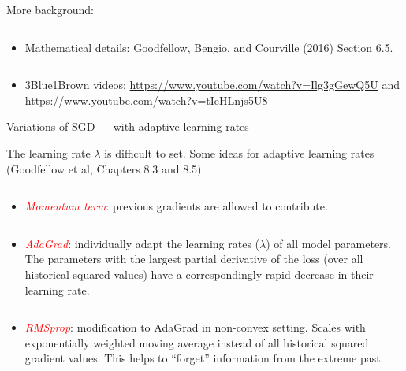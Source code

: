 \documentclass[10pt,ignorenonframetext,]{beamer}
\providecommand{\tightlist}{%
  \setlength{\itemsep}{0pt}\setlength{\parskip}{0pt}}
\begin{document}
\begin{frame}

More background:

\(~\)

\begin{itemize}
\tightlist
\item
  Mathematical details: Goodfellow, Bengio, and Courville (2016) Section
  6.5.\\
\end{itemize}

\(~\)

\begin{itemize}
\tightlist
\item
  3Blue1Brown videos: \url{https://www.youtube.com/watch?v=Ilg3gGewQ5U}
  and \url{https://www.youtube.com/watch?v=tIeHLnjs5U8}
\end{itemize}

\end{frame}

\begin{frame}

\begin{block}{Variations of SGD --- with adaptive learning rates}

\vspace{2mm}

The learning rate \(\lambda\) is difficult to set. Some ideas for
adaptive learning rates (Goodfellow et al, Chapters 8.3 and 8.5).

\(~\)

\begin{itemize}
\tightlist
\item
  \emph{\textcolor{red}{Momentum term}}: previous gradients are allowed
  to contribute.
\end{itemize}

\(~\)

\begin{itemize}
\tightlist
\item
  \emph{\textcolor{red}{AdaGrad}}: individually adapt the learning rates
  (\(\lambda\)) of all model parameters. The parameters with the largest
  partial derivative of the loss (over all historical squared values)
  have a correspondingly rapid decrease in their learning rate.
\end{itemize}

\(~\)

\begin{itemize}
\tightlist
\item
  \emph{\textcolor{red}{RMSprop}}: modification to AdaGrad in non-convex
  setting. Scales with exponentially weighted moving average instead of
  all historical squared gradient values. This helps to ``forget''
  information from the extreme past.
\end{itemize}

\end{block}

\end{frame}
\end{document}
